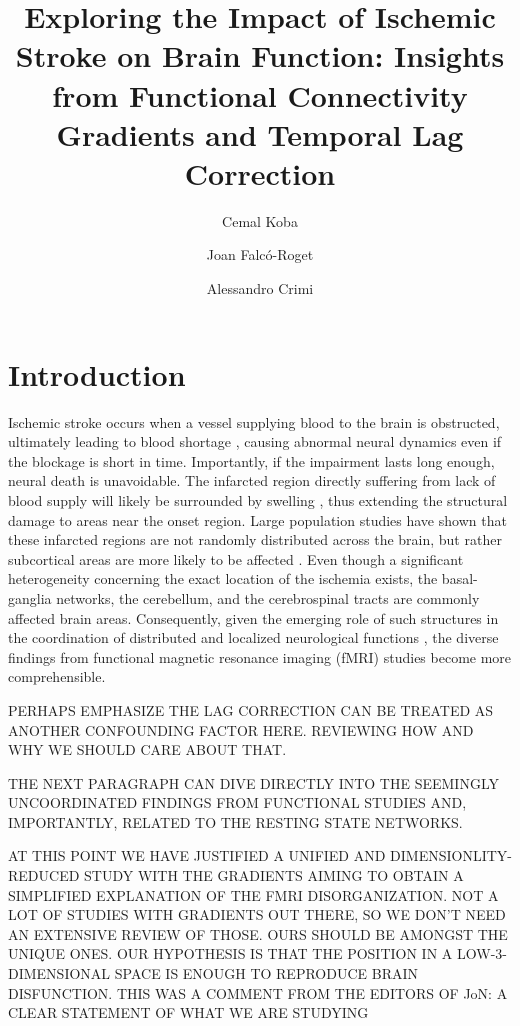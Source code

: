 \documentclass[fleqn,10pt]{wlscirep}
\title{Exploring the Impact of Ischemic Stroke on Brain Function: Insights from Functional Connectivity Gradients and Temporal Lag Correction}
\author[1,*]{Cemal Koba}
\author[1]{Joan Falc\'o-Roget}
\author[1,2]{Alessandro Crimi}
\affil[1]{Sano Centre for Computational Medicine, Computer Vision Team, Krak\'ow, Poland}
\affil[2]{AGH University of Krakow, Krak\'ow, Poland}
\affil[*]{Correspondence: c.koba@sanoscience.org}
\begin{document}
\flushbottom
\maketitle
%
%


\section*{Introduction} 
Ischemic stroke occurs when a vessel supplying blood to the brain is obstructed, ultimately leading to blood shortage \citep{Roach_Bettermann_Biller_2010}, causing abnormal neural dynamics even if the blockage is short in time. Importantly, if the impairment lasts long enough, neural death is unavoidable. The infarcted region directly suffering from lack of blood supply will likely be surrounded by swelling \citep{hong2021hemorrhagic}, thus extending the structural damage to areas near the onset region. Large population studies have shown that these infarcted regions are not randomly distributed across the brain, but rather subcortical areas are more likely to be affected \citep{thiebaut2020brain,weaver2019meta}. Even though a significant heterogeneity concerning the exact location of the ischemia exists, the basal-ganglia networks, the cerebellum, and the cerebrospinal tracts are commonly affected brain areas. \color{purple} Consequently, given the emerging role of such structures in the coordination of distributed and localized neurological functions \citep{bostan2013cerebellar,quartarone2020new}, the diverse findings from functional magnetic resonance imaging (fMRI) studies become more comprehensible. \color{black}

PERHAPS EMPHASIZE THE LAG CORRECTION CAN BE TREATED AS ANOTHER CONFOUNDING FACTOR HERE. REVIEWING HOW AND WHY WE SHOULD CARE ABOUT THAT.

THE NEXT PARAGRAPH CAN DIVE DIRECTLY INTO THE SEEMINGLY UNCOORDINATED FINDINGS FROM FUNCTIONAL STUDIES AND, IMPORTANTLY, RELATED TO THE RESTING STATE NETWORKS. 

AT THIS POINT WE HAVE JUSTIFIED A UNIFIED AND DIMENSIONLITY-REDUCED STUDY WITH THE GRADIENTS AIMING TO OBTAIN A SIMPLIFIED EXPLANATION OF THE FMRI DISORGANIZATION. NOT A LOT OF STUDIES WITH GRADIENTS OUT THERE, SO WE DON'T NEED AN EXTENSIVE REVIEW OF THOSE. OURS SHOULD BE AMONGST THE UNIQUE ONES. OUR HYPOTHESIS IS THAT THE POSITION IN A LOW-3-DIMENSIONAL SPACE IS ENOUGH TO REPRODUCE BRAIN DISFUNCTION. THIS WAS A COMMENT FROM THE EDITORS OF JoN: A CLEAR STATEMENT OF WHAT WE ARE STUDYING
\end{document}
